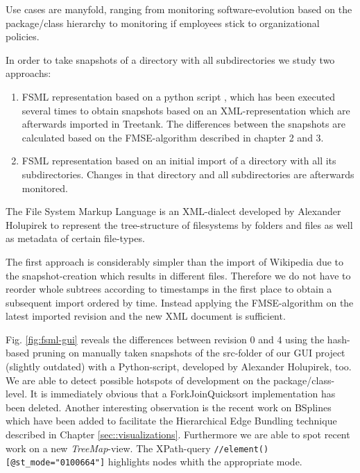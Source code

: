 Use cases are manyfold, ranging from monitoring software-evolution based on the package/class hierarchy to monitoring if employees stick to organizational policies.

In order to take snapshots of a directory with all subdirectories we study two approachs:

\begin{enumerate}
\item FSML representation based on a python script \cite{FSML}, which has been executed several times to obtain snapshots based on an XML-representation which are afterwards imported in Treetank. The differences between the snapshots are calculated based on the FMSE-algorithm described in chapter 2 and 3.
\item FSML representation based on an initial import of a directory with all its subdirectories. Changes in that directory and all subdirectories are afterwards monitored.
\end{enumerate}

The File System Markup Language\cite{FSML} is an XML-dialect developed by Alexander Holupirek to represent the tree-structure of filesystems by folders and files as well as metadata of certain file-types. 

The first approach is considerably simpler than the import of Wikipedia due to the snapshot-creation which results in different files. Therefore we do not have to reorder whole subtrees according to timestamps in the first place to obtain a subsequent import ordered by time. Instead applying the FMSE-algorithm on the latest imported revision and the new XML document is sufficient.

Fig. \ref{fig:fsml-gui} reveals the differences between revision 0 and 4 using the hash-based pruning on manually taken snapshots of the src-folder of our GUI project (slightly outdated) with a Python-script, developed by Alexander Holupirek, too. We are able to detect possible hotspots of development on the package/class-level. It is immediately obvious that a ForkJoinQuicksort implementation has been deleted. Another interesting observation is the recent work on BSplines which have been added to facilitate the Hierarchical Edge Bundling technique described in Chapter \ref{sec::visualizations}. Furthermore we are able to spot recent work on a new \emph{TreeMap}-view. The XPath-query \texttt{//element()[@st\_mode="0100664"]} highlights nodes whith the appropriate mode.

